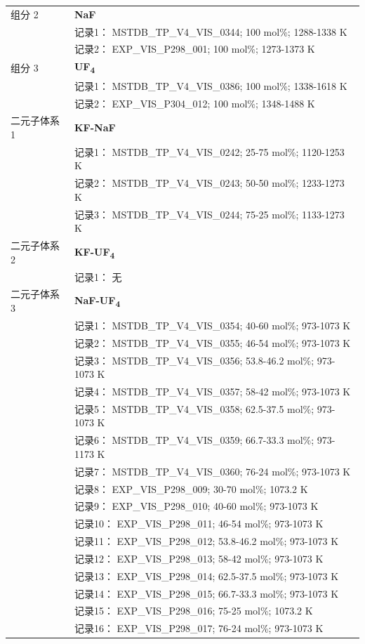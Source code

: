 \documentclass[12pt]{article}
\begin{document}
{\begin{longtable}[]{@{}
  >{\raggedright\arraybackslash}p{}
  >{\raggedright\arraybackslash}p{}@{}}
组分 2  & \textbf{NaF} \\
 & 记录1： MSTDB\_TP\_V4\_VIS\_0344; 100 mol\%; 1288-1338 K \\
 & 记录2： EXP\_VIS\_P298\_001; 100 mol\%; 1273-1373 K  \\

组分 3  & \textbf{UF\textsubscript{4}} \\
 & 记录1： MSTDB\_TP\_V4\_VIS\_0386; 100 mol\%; 1338-1618 K \\
 & 记录2： EXP\_VIS\_P304\_012; 100 mol\%; 1348-1488 K  \\

二元子体系 1  & \textbf{KF-NaF} \\
 & 记录1： MSTDB\_TP\_V4\_VIS\_0242; 25-75 mol\%; 1120-1253 K \\
 & 记录2： MSTDB\_TP\_V4\_VIS\_0243; 50-50 mol\%; 1233-1273 K \\
 & 记录3： MSTDB\_TP\_V4\_VIS\_0244; 75-25 mol\%; 1133-1273 K  \\

二元子体系 2 & \textbf{KF-UF\textsubscript{4}} \\
 & 记录1： 无 \\
二元子体系 3  & \textbf{NaF-UF\textsubscript{4}} \\
 & 记录1： MSTDB\_TP\_V4\_VIS\_0354; 40-60 mol\%; 973-1073 K \\
 & 记录2： MSTDB\_TP\_V4\_VIS\_0355; 46-54 mol\%; 973-1073 K \\
 & 记录3： MSTDB\_TP\_V4\_VIS\_0356; 53.8-46.2 mol\%; 973-1073 K \\
 & 记录4： MSTDB\_TP\_V4\_VIS\_0357; 58-42 mol\%; 973-1073 K \\
 & 记录5： MSTDB\_TP\_V4\_VIS\_0358; 62.5-37.5 mol\%; 973-1073 K \\
 & 记录6： MSTDB\_TP\_V4\_VIS\_0359; 66.7-33.3 mol\%; 973-1173 K \\
 & 记录7： MSTDB\_TP\_V4\_VIS\_0360; 76-24 mol\%; 973-1073 K \\
 & 记录8： EXP\_VIS\_P298\_009; 30-70 mol\%; 1073.2 K \\
 & 记录9： EXP\_VIS\_P298\_010; 40-60 mol\%; 973-1073 K \\
 & 记录10： EXP\_VIS\_P298\_011; 46-54 mol\%; 973-1073 K \\
 & 记录11： EXP\_VIS\_P298\_012; 53.8-46.2 mol\%; 973-1073 K \\
 & 记录12： EXP\_VIS\_P298\_013; 58-42 mol\%; 973-1073 K \\
 & 记录13： EXP\_VIS\_P298\_014; 62.5-37.5 mol\%; 973-1073 K \\
 & 记录14： EXP\_VIS\_P298\_015; 66.7-33.3 mol\%; 973-1073 K \\
 & 记录15： EXP\_VIS\_P298\_016; 75-25 mol\%; 1073.2 K \\
 & 记录16： EXP\_VIS\_P298\_017; 76-24 mol\%; 973-1073 K  \\


\end{longtable}}
\end{document}
